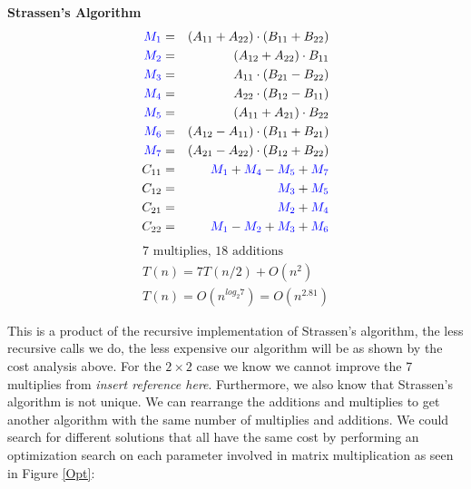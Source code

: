 \documentclass[MS]{wfuthesis}
\begin{document}
\begin{multicols}{2}
                        \textbf{Strassen's Algorithm}
                            \begin{eqnarray*}
                                \color{blue} M_1 & = & (A_{11} + A_{22})\cdot (B_{11} + B_{22}) \\
                                \color{blue} M_2 & = & (A_{12} + A_{22})\cdot B_{11} \\
                                \color{blue} M_3 & = & A_{11}\cdot (B_{21} - B_{22}) \\
                                \color{blue} M_4 & = & A_{22}\cdot (B_{12} - B_{11}) \\
                                \color{blue} M_5 & = & (A_{11} + A_{21})\cdot B_{22} \\
                                \color{blue} M_6 & = & (A_{12} - A_{11})\cdot (B_{11} + B_{21}) \\
                                \color{blue} M_7 & = & (A_{21} - A_{22})\cdot (B_{12} + B_{22}) \\
                                C_{11} & = & \color{blue} M_1 \color{black} + \color{blue} M_4 \color{black} - \color{blue} M_5 \color{black} + \color{blue} M_7 \\
                                C_{12} & = & \color{blue} M_3 \color{black} + \color{blue} M_5 \\
                                C_{21} & = & \color{blue} M_2 \color{black} + \color{blue} M_4 \\
                                C_{22} & = & \color{blue} M_1 \color{black} - \color{blue} M_2 \color{black} + \color{blue} M_3 \color{black} + \color{blue} M_6
                            \end{eqnarray*}
                            \vspace{-40pt}
                            \begin{eqnarray*}
                                \text{7 multiplies, 18 additions} \\
                                T(n) = 7T(n/2) + O(n^2) \\
                                T(n) = O(n^{log_2 7}) = O(n^{2.81})
                            \end{eqnarray*}
                    \end{multicols}

                    This is a product of the recursive implementation of Strassen's algorithm, the less recursive calls we do, the less expensive our algorithm will be as shown by the cost analysis above. For the $2 \times 2$ case we know we cannot improve the 7 multiplies from \textit{insert reference here}. Furthermore, we also know that Strassen's algorithm is not unique. We can rearrange the additions and multiplies to get another algorithm with the same number of multiplies and additions. We could search for different solutions that all have the same cost by performing an optimization search on each parameter involved in matrix multiplication as seen in Figure \ref{Opt}:
\end{document}
